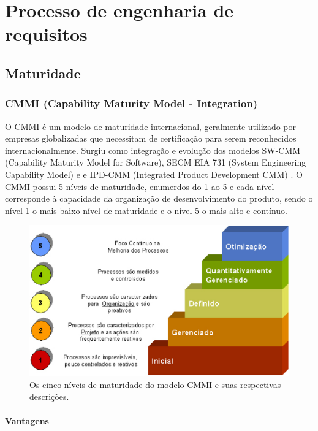 \chapter{Processo de engenharia de requisitos}
\section{Maturidade}
  \subsection{CMMI (Capability Maturity Model - Integration)}

  O CMMI é um modelo de maturidade internacional, geralmente utilizado por empresas
  globalizadas que necessitam de certificação para serem reconhecidos internacionalmente.
  Surgiu como integração e evolução dos modelos SW-CMM (Capability Maturity Model for Software),
  SECM EIA 731 (System Engineering Capability Model) e  e IPD-CMM
  (Integrated Product Development CMM) \cite{mct2006}.
  O CMMI possui 5 níveis de maturidade, enumerdos do 1 ao 5 e cada nível corresponde
  à capacidade da organização de desenvolvimento do produto, sendo o nível 1 o mais
  baixo nível de maturidade e o nível 5 o mais alto e contínuo.

  \begin{figure}[!ht]
    \centering
    \includegraphics[width=15cm, keepaspectratio=true]{figuras/maturidade/niveis-cmmi.eps}
    \caption{Os cinco níveis de maturidade do modelo CMMI e suas respectivas descrições.}
  \end{figure}

    \subsubsection{Vantagens}

